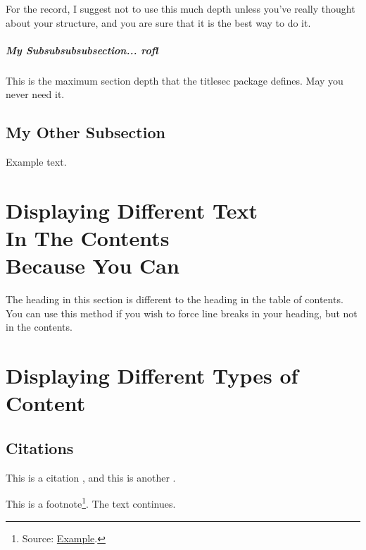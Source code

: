 For the record, I suggest not to use this much depth unless you've really thought about your structure, and you are sure that it is the best way to do it.


\subparagraph{My Subsubsubsubsection... rofl} \label{sssssec:Snake}
This is the maximum section depth that the titlesec package defines. May you never need it.


\subsection{My Other Subsection} \label{ssec:SuperSuperRareBotan}
Example text.


\section[Displaying Different Text In The Contents]{Displaying Different Text\\In The Contents\\Because You Can}  \label{sec:LineBreaks}
The heading in this section is different to the heading in the table of contents. You can use this method if you wish to force line breaks in your heading, but not in the contents.


\section{Displaying Different Types of Content} \label{sec:ContentTypes}


\subsection{Citations}
This is a citation \cite{example1}, and this is another \cite{example1,example2,example4,example5}.

This is a footnote\footnote{Source: \href{https://www.example.com/}{Example}.}. The text continues.


